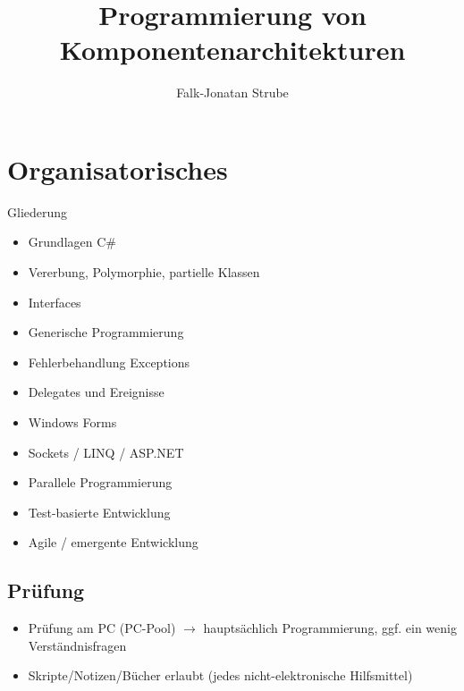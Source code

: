 \documentclass{scrreprt}
\title{Programmierung von Komponentenarchitekturen}
\author{Falk-Jonatan Strube}
\begin{document}
\maketitle
\tableofcontents

\chapter*{Organisatorisches}
Gliederung
\begin{itemize}
\item Grundlagen C\#
\item Vererbung, Polymorphie, partielle Klassen
\item Interfaces
\item Generische Programmierung
\item Fehlerbehandlung Exceptions
\item Delegates und Ereignisse
\item Windows Forms
\item Sockets / LINQ / ASP.NET
\item Parallele Programmierung
\item Test-basierte Entwicklung
\item Agile / emergente Entwicklung 
\end{itemize}

\section{Prüfung}
\begin{itemize}
\item Prüfung am PC (PC-Pool) $\to$ hauptsächlich Programmierung, ggf. ein wenig Verständnisfragen
\item Skripte/Notizen/Bücher erlaubt (jedes nicht-elektronische Hilfsmittel)
\end{itemize}
\end{document}
